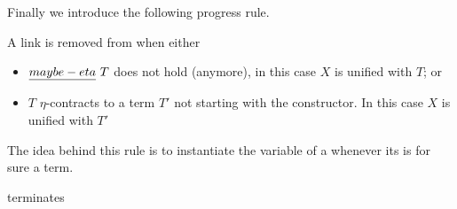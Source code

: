 Finally
we introduce the following
\linketa progress rule.

\newcommand{\progressetaright}{\emph{$\eta$-progress-\rhs}\xspace}
\begin{definition}[\progressetaright]\label{def:progressetaright} A link
 is removed from \linkStore when either 
\begin{itemize}
  \item $\emph{maybe-eta}~T$ does not hold (anymore), in this case $X$ is unified
        with $T$; or
  \item $T$ $\eta$-contracts to a term $T'$ not starting with the \mlam
        constructor. In this case $X$ is unified with $T'$
\end{itemize}
\end{definition}

The idea behind this rule is to instantiate the \lhs variable of a \linketa
whenever its \rhs is for sure a \wellb term.

\begin{lemma}
   terminates
\end{lemma}


